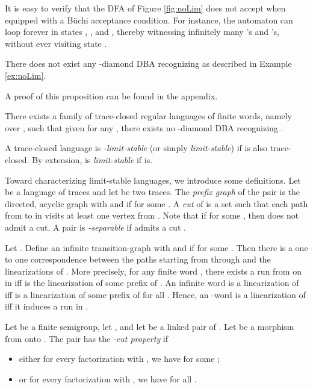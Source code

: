It is easy to verify that the DFA of Figure \ref{fig:noLim} does not accept   when equipped with a Büchi acceptance condition. For instance, the automaton can loop forever in states , , and , thereby witnessing infinitely many 's and 's, without ever visiting state .

\begin{proposition}\label{prop:noLim}
 There does not exist any -diamond DBA recognizing  as described in Example \ref{ex:noLim}.
\end{proposition}
\noindent A proof of this proposition can be found in the appendix.




\begin{corollary}
 There exists a family  of trace-closed regular languages of finite words, namely  over , such that given  for any , there exists no -diamond DBA recognizing .
\end{corollary}

\begin{definition}
 A trace-closed language  is \emph{-limit-stable} (or simply \emph{limit-stable}) if  is also trace-closed. By extension,  is \emph{limit-stable} if  is.
\end{definition}

Toward characterizing limit-stable languages, we introduce some definitions. Let  be a language of traces and let  be two traces. The \emph{prefix graph} of the pair  is the directed, acyclic graph  with  and  if  for some . A \emph{cut} of  is a set  such that each path from  to  in  visits at least one vertex from . Note that if  for some , then  does not admit a cut. A pair  is \emph{-separable} if  admits a cut .

Let . Define an infinite transition-graph  with  and  if  for some . Then there is a one to one correspondence between the paths starting from  through  and the linearizations of . More precisely, for any finite word , there exists a run  from  on  in  iff  is the linearization of some prefix  of . An infinite word  is a linearization of  iff  is a linearization of some prefix  of  for all . Hence, an -word  is a linearization of  iff it induces a run  in . 

Let  be a finite semigroup, let , and let  be a linked pair of . Let  be a morphism from  onto . The pair  has the \emph{-cut property} if
\begin{itemize}
\item either for every factorization  with , we have  for some ;
\item or for every factorization  with , we have  for all .
\end{itemize}

